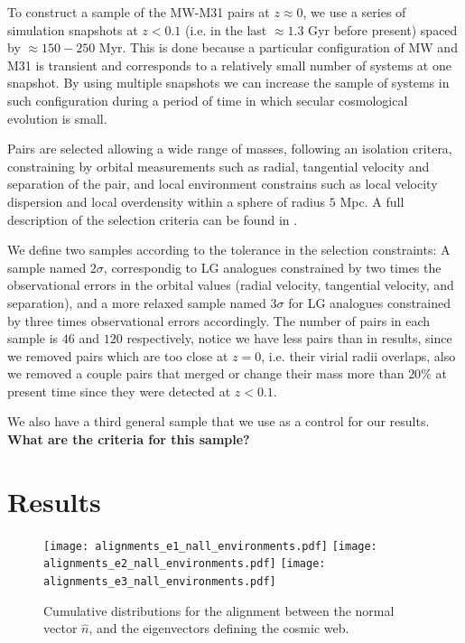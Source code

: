 \documentclass{emulateapj}
\newcommand{\mpc}{\rm{Mpc}}
\begin{document}
To construct a sample of the MW-M31 pairs at $z\approx 0$, we use a
series of simulation snapshots  at $z<0.1$ (i.e. in the last $\approx
1.3$ Gyr before present) spaced by $\approx 150-250$ Myr. This is done
because a particular configuration of MW and M31 is transient and
corresponds to a relatively small number of systems at one
snapshot. By using multiple snapshots we can increase the sample of
systems in such configuration during a period of time in which secular
cosmological evolution is small. 

Pairs are selected allowing a wide range of masses, following an
isolation critera, constraining by orbital measurements such as
radial, tangential velocity and separation of the pair, and local
environment constrains such as local velocity dispersion and local
overdensity within a sphere of radius $5$ \mpc. A full description of
the selection criteria can be found in \citet{lganalogues,sat}. 

We define two samples according to the tolerance in the selection constraints:
A sample named $2\sigma$, correspondig to LG analogues constrained by
two times the observational errors in the orbital values (radial
velocity, tangential velocity, and separation), and a more relaxed
sample named $3\sigma$ for LG analogues constrained by three times
observational errors accordingly. The number of pairs in each sample
is $46$ and $120$ respectively, notice we have less pairs than in
\citet{lganalogues} results, since we removed pairs which are too
close at $z=0$, i.e. their virial radii overlaps, also we removed a
couple pairs that merged or change their mass more than $20\%$ at
present time since they were detected at $z<0.1$.  

We also have a third general sample that we use as a control for our
results. {\bf What are the criteria for this sample?}

\section{Results}
\label{sec:results}


\begin{figure}
\begin{center}
  \texttt{[image: alignments\_e1\_nall\_environments.pdf]} 
  \texttt{[image: alignments\_e2\_nall\_environments.pdf]} 
  \texttt{[image: alignments\_e3\_nall\_environments.pdf]} 
\end{center}
\caption{Cumulative distributions for the alignment between the normal vector
$\hat{n}$, and the eigenvectors defining the cosmic web.
    \label{fig:alignment}}  
\end{figure}
\end{document}
